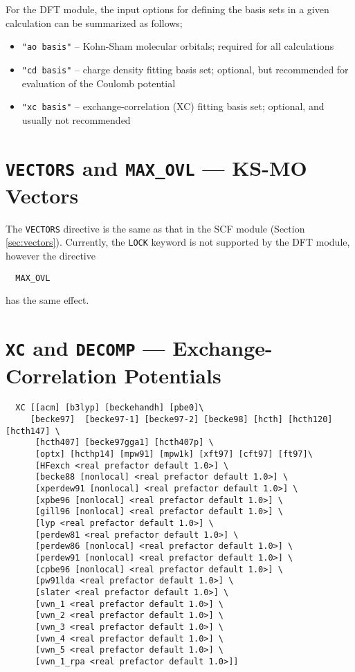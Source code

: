 For the DFT module, the input options for defining the basis sets in a given
calculation can be summarized as follows;
\begin{itemize}
\item {\tt "ao basis"} -- Kohn-Sham molecular orbitals; required for all 
calculations
\item {\tt "cd basis"} -- charge density fitting basis set; optional, but
recommended for evaluation of the Coulomb potential
\item {\tt "xc basis"} -- exchange-correlation (XC) fitting basis set; 
optional, and usually not recommended
\end{itemize}


\section{{\tt VECTORS} and {\tt MAX\_OVL} --- KS-MO Vectors}

The \verb+VECTORS+ directive is the same as that in the SCF module
(Section \ref{sec:vectors}).  Currently, the \verb+LOCK+ keyword
is not supported by the DFT module, however the directive
\begin{verbatim}
  MAX_OVL
\end{verbatim}
has the same effect.

\section{{\tt XC} and {\tt DECOMP} --- Exchange-Correlation Potentials}
\label{sec:xc}
\begin{verbatim}
  XC [[acm] [b3lyp] [beckehandh] [pbe0]\
     [becke97]  [becke97-1] [becke97-2] [becke98] [hcth] [hcth120] [hcth147] \
      [hcth407] [becke97gga1] [hcth407p] \
      [optx] [hcthp14] [mpw91] [mpw1k] [xft97] [cft97] [ft97]\
      [HFexch <real prefactor default 1.0>] \
      [becke88 [nonlocal] <real prefactor default 1.0>] \
      [xperdew91 [nonlocal] <real prefactor default 1.0>] \
      [xpbe96 [nonlocal] <real prefactor default 1.0>] \
      [gill96 [nonlocal] <real prefactor default 1.0>] \
      [lyp <real prefactor default 1.0>] \
      [perdew81 <real prefactor default 1.0>] \
      [perdew86 [nonlocal] <real prefactor default 1.0>] \
      [perdew91 [nonlocal] <real prefactor default 1.0>] \
      [cpbe96 [nonlocal] <real prefactor default 1.0>] \
      [pw91lda <real prefactor default 1.0>] \
      [slater <real prefactor default 1.0>] \
      [vwn_1 <real prefactor default 1.0>] \
      [vwn_2 <real prefactor default 1.0>] \
      [vwn_3 <real prefactor default 1.0>] \
      [vwn_4 <real prefactor default 1.0>] \
      [vwn_5 <real prefactor default 1.0>] \
      [vwn_1_rpa <real prefactor default 1.0>]]
\end{verbatim}


